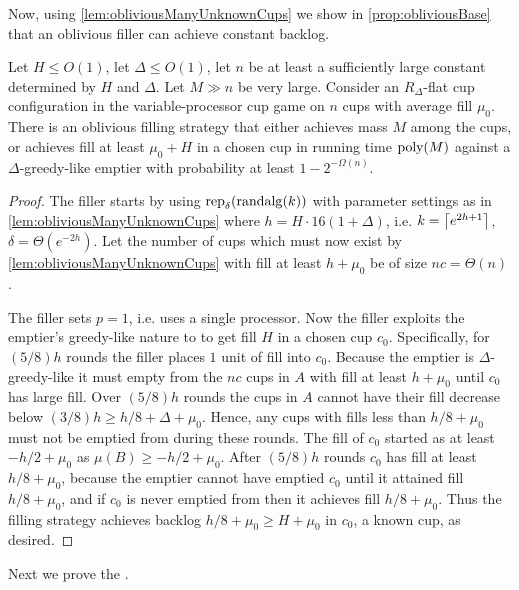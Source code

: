 Now, using \cref{lem:obliviousManyUnknownCups} we show in
\cref{prop:obliviousBase} that an oblivious filler can achieve
constant backlog. 
\begin{proposition}
  \label{prop:obliviousBase}
  Let $H \le O(1)$, let $\Delta \le O(1)$, let $n$ be at
  least a sufficiently large constant determined by $H$ and
  $\Delta$. 
  Let $M \gg n$ be very large.
  Consider an $R_\Delta$-flat cup configuration in the variable-processor cup
  game on $n$ cups with average fill $\mu_0$.
  There is an oblivious filling strategy that either
  achieves mass $M$ among the cups, or achieves fill at least $\mu_0 + H$
  in a chosen cup in running time $\operatorname{\text{poly}}(M)$ against a
  $\Delta$-greedy-like emptier with probability at least $1-2^{-\Omega(n)}.$
\end{proposition}
\begin{proof}
  The filler starts by using $\operatorname{\text{\textup{rep}}}_\delta(\operatorname{\text{\textup{randalg}}}(k))$ with
  parameter settings as in \cref{lem:obliviousManyUnknownCups}
  where $h = H\cdot 16(1+\Delta)$, i.e. $k = \left\lceil e^{2h+1} \right\rceil$,
  $\delta = \Theta(e^{-2h})$. 
  Let the number of cups which must now exist by
  \cref{lem:obliviousManyUnknownCups} with
  fill at least $h+\mu_0$ be of size $nc = \Theta(n)$.

  The filler sets $p=1$, i.e. uses a single processor. Now the
  filler exploits the emptier's greedy-like nature to to get fill
  $H$ in a chosen cup $c_0$. Specifically, for $(5/8)h$ rounds
  the filler places $1$ unit of fill into $c_0$. Because the
  emptier is $\Delta$-greedy-like it must empty from the $nc$
  cups in $A$ with fill at least $h+\mu_0$ until $c_0$ has large
  fill. Over $(5/8)h$ rounds the cups in $A$ cannot have their
  fill decrease below $(3/8)h \ge h/8 + \Delta + \mu_0$. Hence,
  any cups with fills less than $h/8+\mu_0$ must not be emptied
  from during these rounds. The fill of $c_0$ started as at least
  $-h/2+\mu_0$ as $\mu(B) \ge -h/2+\mu_0$. After $(5/8)h$ rounds
  $c_0$ has fill at least $h/8+\mu_0$, because the emptier cannot
  have emptied $c_0$ until it attained fill $h/8+\mu_0$, and if
  $c_0$ is never emptied from then it achieves fill $h/8+\mu_0$.
  Thus the filling strategy achieves backlog $h/8 +\mu_0 \ge H +
  \mu_0$ in $c_0$, a known cup, as desired.

\end{proof}

Next we prove the .

